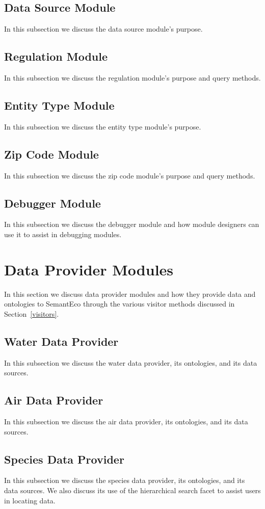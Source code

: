 \documentclass[letterpaper]{report}
\begin{document}
\subsection{Data Source Module}
In this subsection we discuss the data source module's purpose.
\subsection{Regulation Module}
In this subsection we discuss the regulation module's purpose and query methods.
\subsection{Entity Type Module}
In this subsection we discuss the entity type module's purpose.
\subsection{Zip Code Module}
In this subsection we discuss the zip code module's purpose and query methods.
\subsection{Debugger Module}
In this subsection we discuss the debugger module and how module designers can use it to assist in debugging modules.
\section{Data Provider Modules}
In this section we discuss data provider modules and how they provide data and ontologies to SemantEco through the various visitor methods discussed in Section~\ref{visitors}.
\subsection{Water Data Provider}
In this subsection we discuss the water data provider, its ontologies, and its data sources.
\subsection{Air Data Provider}
In this subsection we discuss the air data provider, its ontologies, and its data sources.
\subsection{Species Data Provider}
In this subsection we discuss the species data provider, its ontologies, and its data sources. We also discuss its use of the hierarchical search facet to assist users in locating data.
\end{document}
